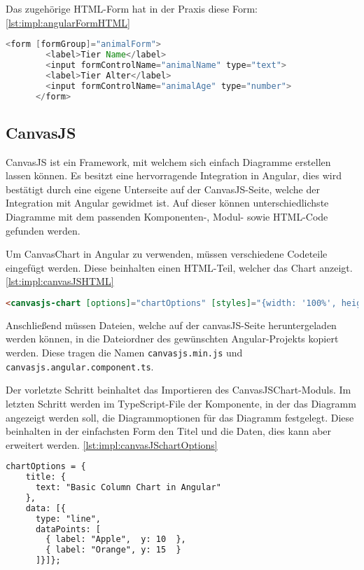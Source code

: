 Das zugehörige HTML-Form hat in der Praxis diese Form:  \ref{lst:impl:angularFormHTML}
 
 
\begin{lstlisting}[language=java,caption=Beispiel für ein reaktives Formular,label=lst:impl:angularFormHTML]
  <form [formGroup]="animalForm">
        <label>Tier Name</label>
        <input formControlName="animalName" type="text">
        <label>Tier Alter</label>
        <input formControlName="animalAge" type="number">
      </form>
\end{lstlisting}
 
 
 
\subsection{CanvasJS}
 
CanvasJS ist ein Framework, mit welchem sich einfach Diagramme erstellen lassen können. Es besitzt eine hervorragende Integration in Angular, dies wird bestätigt durch eine eigene Unterseite auf der CanvasJS-Seite, welche der Integration mit Angular gewidmet ist. Auf dieser können unterschiedlichste Diagramme mit dem passenden Komponenten-, Modul- sowie HTML-Code gefunden werden.
 
Um CanvasChart in Angular zu verwenden, müssen verschiedene Codeteile eingefügt werden. Diese beinhalten einen HTML-Teil, welcher das Chart anzeigt. \ref{lst:impl:canvasJSHTML}
 
\begin{lstlisting}[language=html,caption=CanvasJS HTML,label=lst:impl:canvasJSHTML]
  <canvasjs-chart [options]="chartOptions" [styles]="{width: '100%', height: '360px'}"></canvasjs-chart>
\end{lstlisting}
 
Anschließend müssen Dateien, welche auf der canvasJS-Seite heruntergeladen werden können, in die Dateiordner des gewünschten Angular-Projekts kopiert werden. Diese tragen die Namen \texttt{canvasjs.min.js} und \texttt{canvasjs.angular.component.ts}.
 
Der vorletzte Schritt beinhaltet das Importieren des CanvasJSChart-Moduls.
Im letzten Schritt werden im TypeScript-File der Komponente, in der das Diagramm angezeigt werden soll, die Diagrammoptionen für das Diagramm festgelegt. Diese beinhalten in der einfachsten Form den Titel und die Daten, dies kann aber erweitert werden. \ref{lst:impl:canvasJSchartOptions}
 
\begin{lstlisting}[language=html,caption=CanvasJS chartOptiones,label=lst:impl:canvasJSchartOptions]
  chartOptions = {
    title: {
      text: "Basic Column Chart in Angular"
    },
    data: [{
      type: "line",
      dataPoints: [
        { label: "Apple",  y: 10  },
        { label: "Orange", y: 15  }
      ]}]};
\end{lstlisting}
 
